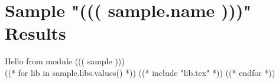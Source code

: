 \part{Sample "((( sample.name )))" Results}
\label{sample:(((sample.name)))}

Hello from module ((( sample ))) \\

((* for lib in sample.libs.values() *))
((* include "lib.tex" *))
\clearpage
((* endfor *))
